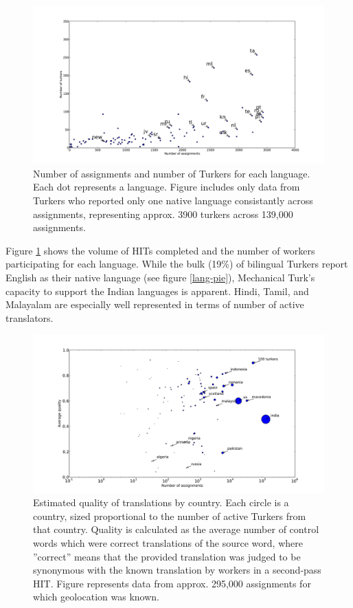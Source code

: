 \documentclass[11pt]{article}
\begin{document}
\begin{figure}[h]
\centering
\includegraphics[width=6in]{final-figures/assign-turk-scatter}
\caption{Number of assignments and number of Turkers for each language. Each dot represents a language. Figure includes only data from Turkers who reported only one native language consistantly across assignments, representing approx. 3900 turkers across 139,000 assignments.}
\label{ass-scatter}
\end{figure}

Figure \ref{ass-scatter} shows the volume of HITs completed and the number of workers participating for each language. While the bulk (19\%) of bilingual Turkers report English as their native language (see figure \ref{lang-pie}), Mechanical Turk's capacity to support the Indian languages is apparent. Hindi, Tamil, and Malayalam are especially well represented in terms of number of active translators. 

\begin{figure}[h]
\centering
\includegraphics[width=6in]{final-figures/quality-scatter}
\caption{Estimated quality of translations by country. Each circle is a country, sized proportional to the number of active Turkers from that country. Quality is calculated as the average number of control words which were correct translations of the source word, where ”correct” means that the provided translation was judged to be synonymous with the known translation by workers in a second-pass HIT. Figure represents data from approx. 295,000 assignments for which geolocation was known.}
\label{quality-scatter}
\end{figure}
\end{document}
